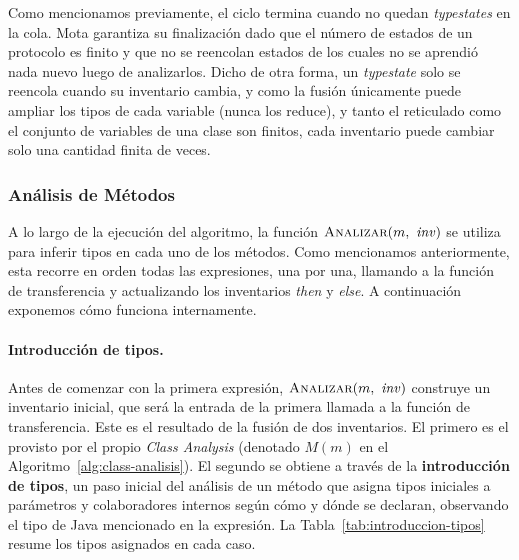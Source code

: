 Como mencionamos previamente, el ciclo termina cuando no quedan \textit{typestates} en la cola. Mota garantiza su finalización dado que el número de estados de un protocolo es finito y que no se reencolan estados de los cuales no se aprendió nada nuevo luego de analizarlos. Dicho de otra forma, un \textit{typestate} solo se reencola cuando su inventario cambia, y como la fusión únicamente puede ampliar los tipos de cada variable (nunca los reduce), y tanto el reticulado como el conjunto de variables de una clase son finitos, cada inventario puede cambiar solo una cantidad finita de veces.

\subsubsection{Análisis de Métodos}

A lo largo de la ejecución del algoritmo, la función $\textsc{Analizar}(m,\ \mathit{inv})$ se utiliza para inferir tipos en cada uno de los métodos. Como mencionamos anteriormente, esta recorre en orden todas las expresiones, una por una, llamando a la función de transferencia y actualizando los inventarios \textit{then} y \textit{else}. A continuación exponemos cómo funciona internamente.

\paragraph{Introducción de tipos.}
Antes de comenzar con la primera expresión, $\textsc{Analizar}(m,\ \mathit{inv})$ construye un inventario inicial, que será la entrada de la primera llamada a la función de transferencia. Este es el resultado de la fusión de dos inventarios. El primero es el provisto por el propio \textit{Class Analysis} (denotado $M(m)$ en el Algoritmo~\ref{alg:class-analisis}). El segundo se obtiene a través de la \textbf{introducción de tipos}, un paso inicial del análisis de un método que asigna tipos iniciales a parámetros y colaboradores internos según cómo y dónde se declaran, observando el tipo de Java mencionado en la expresión. La Tabla~\ref{tab:introduccion-tipos} resume los tipos asignados en cada caso.

